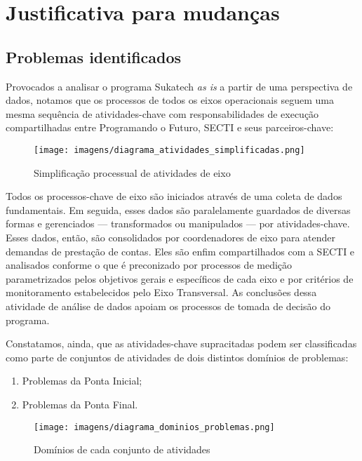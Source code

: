 \documentclass[
	12pt,				%
	openright,			%
	twoside,			%
	a4paper,			%
	english,			%
	french,				%
	spanish,			%
	brazil,				%
	]{abntex2}
\begin{document}
\part{Justificativa para mudanças}

\chapter{Problemas identificados}
Provocados a analisar o programa Sukatech \textit{as is} a partir de uma perspectiva de dados, notamos que os processos de todos os eixos operacionais seguem uma mesma sequência de atividades-chave com responsabilidades de execução compartilhadas entre Programando o Futuro, SECTI e seus parceiros-chave:

\begin{figure}[htb]
\caption{\label{atividades_simplificadas}Simplificação processual de atividades de eixo}
	\begin{center}
  \texttt{[image: imagens/diagrama\_atividades\_simplificadas.png]}
	\end{center}
\end{figure}

Todos os processos-chave de eixo são iniciados através de uma coleta de dados fundamentais. Em seguida, esses dados são paralelamente guardados de diversas formas e gerenciados — transformados ou manipulados — por atividades-chave. Esses dados, então, são consolidados por coordenadores de eixo para atender demandas de prestação de contas. Eles são enfim compartilhados com a SECTI e analisados conforme o que é preconizado por processos de medição parametrizados pelos objetivos gerais e específicos de cada eixo e por critérios de monitoramento estabelecidos pelo Eixo Transversal. As conclusões dessa atividade de análise de dados apoiam os processos de tomada de decisão do programa.

Constatamos, ainda, que as atividades-chave supracitadas podem ser classificadas como parte de conjuntos de atividades de dois distintos domínios de problemas:

\begin{enumerate}
  \item Problemas da Ponta Inicial;
  \item Problemas da Ponta Final.
\end{enumerate}

\begin{figure}[h]
	\caption{\label{rep_dominios}Domínios de cada conjunto de atividades}
	\begin{center}

  \texttt{[image: imagens/diagrama\_dominios\_problemas.png]}
	\end{center}
\end{figure}
\end{document}
